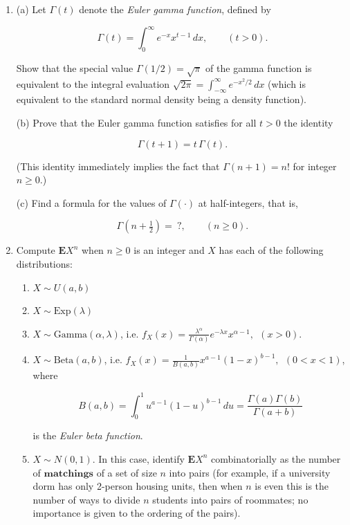 \documentclass[11pt]{report}
\theoremstyle{plain}
\theoremstyle{definition}
\begin{document}
\begin{enumerate}[label=\arabic*.]
\item (a) Let $\Gamma(t)$ denote the \emph{Euler gamma
function}, defined by

\[
\Gamma(t) = \int_0^\infty e^{-x} x^{t-1}\,dx, \qquad (t>0).
\]

Show that the special value $\Gamma(1/2)=\sqrt{\pi}$
of the gamma function is equivalent to the integral
evaluation
$\sqrt{2\pi} = \int_{-\infty}^\infty e^{-x^2/2}\,dx$
(which is equivalent to the standard normal density
being a density function).

(b) Prove that the Euler gamma function satisfies for
all $t>0$ the identity

\[
\Gamma(t+1)=t\,\Gamma(t).
\]

(This identity immediately implies the fact that
$\Gamma(n+1)=n!$ for integer $n\ge 0$.)

(c) Find a formula for the values of $\Gamma(\cdot)$
at half-integers, that is,

\[
\Gamma\left(n+\tfrac12\right) =\ ?, \qquad (n\ge 0).
\]

\item Compute $\mathbf{E} X^n$ when $n\ge 0$ is an integer
and $X$ has each of the following distributions:

\begin{enumerate}[label=(\alph*)]
\item $X\sim U(a,b)$

\item $X\sim \textrm{Exp}(\lambda)$

\item $X\sim \textrm{Gamma}(\alpha, \lambda)$, i.e.
$f_{X}(x) =
\frac{\lambda^\alpha}{\Gamma(\alpha)}e^{-\lambda x}
x^{\alpha-1}, \ \  (x>0)$.

\item $X\sim \textrm{Beta}(a, b)$, i.e.
$f_X(x) = \frac{1}{B(a,b)} x^{a-1} (1-x)^{b-1}, \ \
(0<x<1)$,
where

\[
B(a,b)=\int_0^1 u^{a-1}(1-u)^{b-1}\,du = \frac{\Gamma(a)\Gamma(b)}{\Gamma(a+b)}
\]

is the \emph{Euler beta function}.

\item $X\sim N(0,1)$. In this case, identify
$\mathbf{E} X^n$ combinatorially as the number of
$\textbf{matchings}$ of a set of size $n$ into pairs
(for example, if a university dorm has only 2-person
housing units, then when $n$ is even this is the
number of ways to divide $n$ students into pairs of
roommates; no importance is given to the ordering of
the pairs).


\end{enumerate}
\end{enumerate}
\end{document}
